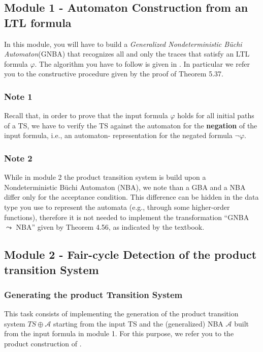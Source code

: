 \documentclass{article}
\begin{document}
\subsection{Module 1 - Automaton Construction from an LTL formula}
\label{subsec-m1}
In this module, you will have to build a \emph{Generalized Nondeterministic Büchi Automaton}(GNBA) 
that recognizes all and only the traces that satisfy an LTL formula $\varphi$. The algorithm you have to follow 
is given in \cite[Section 5.2]{BaKa}. 
In particular we refer you to the constructive procedure given by the proof of Theorem 5.37.


\subsubsection*{Note 1}
Recall that, in order to prove that the input formula $\varphi$ holds for all initial paths of a TS, we have 
to verify the TS against the automaton for the \textbf{negation} of the input formula, i.e., an automaton-
representation for the negated formula $\neg \varphi$.

\subsubsection*{Note 2}
While in module 2 the product transition system is build upon a Nondeterministic Büchi Automaton (NBA), we note 
than a GBA and a NBA differ only for the acceptance condition. This difference can be hidden in the 
data type you use to represent the automata (e.g., through some higher-order functions), 
therefore it is not needed to implement the transformation ``GNBA $\leadsto$ NBA'' given by Theorem 4.56, as indicated 
by the textbook.

\subsection{Module 2 - Fair-cycle Detection of the product transition System}
\label{subsec-m2}
\subsubsection*{Generating the product Transition System}
This task consists of implementing the generation of the product transition system $TS \oplus \mathcal{A}$
starting from the input TS and the (generalized) NBA $\mathcal{A}$ built from the input formula in module 1.
For this purpose, we refer you to the product construction of \cite[Section 4.4.1]{BaKa}.
\end{document}
